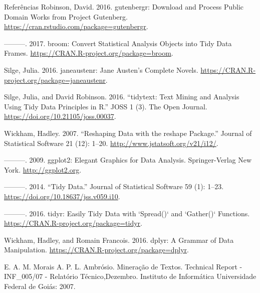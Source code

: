 \documentclass[
  ignorenonframetext,
]{beamer}
\begin{document}
\begin{frame}{Referências}
Robinson, David. 2016. gutenbergr: Download and Process Public Domain
Works from Project Gutenberg.
\url{https://cran.rstudio.com/package=gutenbergr}.

---------. 2017. broom: Convert Statistical Analysis Objects into Tidy
Data Frames. \url{https://CRAN.R-project.org/package=broom}.

Silge, Julia. 2016. janeaustenr: Jane Austen's Complete Novels.
\url{https://CRAN.R-project.org/package=janeaustenr}.

Silge, Julia, and David Robinson. 2016. ``tidytext: Text Mining and
Analysis Using Tidy Data Principles in R.'' JOSS 1 (3). The Open
Journal. \url{https://doi.org/10.21105/joss.00037}.

Wickham, Hadley. 2007. ``Reshaping Data with the reshape Package.''
Journal of Statistical Software 21 (12): 1--20.
\url{http://www.jstatsoft.org/v21/i12/}.

---------. 2009. ggplot2: Elegant Graphics for Data Analysis.
Springer-Verlag New York. \url{http://ggplot2.org}.

---------. 2014. ``Tidy Data.'' Journal of Statistical Software 59 (1):
1--23. \url{https://doi.org/10.18637/jss.v059.i10}.

---------. 2016. tidyr: Easily Tidy Data with `Spread()` and `Gather()`
Functions. \url{https://CRAN.R-project.org/package=tidyr}.

Wickham, Hadley, and Romain Francois. 2016. dplyr: A Grammar of Data
Manipulation. \url{https://CRAN.R-project.org/package=dplyr}.

E. A. M. Morais A. P. L. Ambrósio. Mineração de Textos. Technical Report
- INF\_005/07 - Relatório Técnico,Dezembro. Instituto de Informática
Universidade Federal de Goiás: 2007.
\end{frame}
\end{document}
